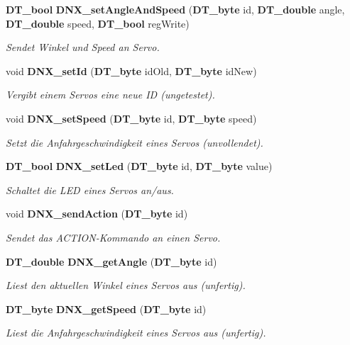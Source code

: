 \begin{DoxyCompactItemize}
{\bf DT\_\-bool} {\bf DNX\_\-setAngleAndSpeed} ({\bf DT\_\-byte} id, {\bf DT\_\-double} angle, {\bf DT\_\-double} speed, {\bf DT\_\-bool} regWrite)
\begin{DoxyCompactList}\small\item\em Sendet Winkel und Speed an Servo. \item\end{DoxyCompactList}\item 
void {\bf DNX\_\-setId} ({\bf DT\_\-byte} idOld, {\bf DT\_\-byte} idNew)
\begin{DoxyCompactList}\small\item\em Vergibt einem Servos eine neue ID (ungetestet). \item\end{DoxyCompactList}\item 
void {\bf DNX\_\-setSpeed} ({\bf DT\_\-byte} id, {\bf DT\_\-byte} speed)
\begin{DoxyCompactList}\small\item\em Setzt die Anfahrgeschwindigkeit eines Servos (unvollendet). \item\end{DoxyCompactList}\item 
{\bf DT\_\-bool} {\bf DNX\_\-setLed} ({\bf DT\_\-byte} id, {\bf DT\_\-byte} value)
\begin{DoxyCompactList}\small\item\em Schaltet die LED eines Servos an/aus. \item\end{DoxyCompactList}\item 
void {\bf DNX\_\-sendAction} ({\bf DT\_\-byte} id)
\begin{DoxyCompactList}\small\item\em Sendet das ACTION-\/Kommando an einen Servo. \item\end{DoxyCompactList}\item 
{\bf DT\_\-double} {\bf DNX\_\-getAngle} ({\bf DT\_\-byte} id)
\begin{DoxyCompactList}\small\item\em Liest den aktuellen Winkel eines Servos aus (unfertig). \item\end{DoxyCompactList}\item 
{\bf DT\_\-byte} {\bf DNX\_\-getSpeed} ({\bf DT\_\-byte} id)
\begin{DoxyCompactList}\small\item\em Liest die Anfahrgeschwindigkeit eines Servos aus (unfertig). \item\end{DoxyCompactList}\item 

\end{DoxyCompactItemize}
